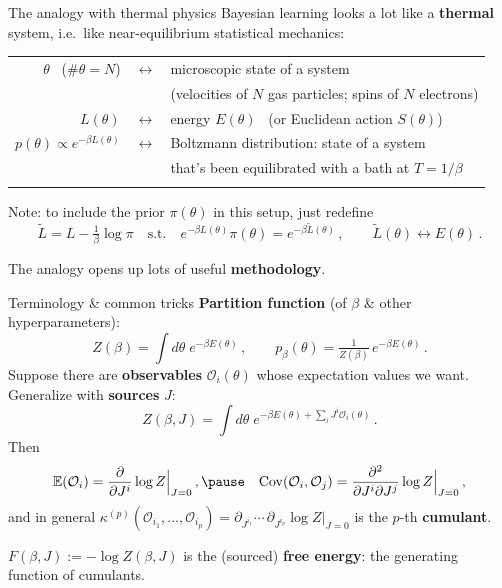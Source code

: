 \documentclass[11pt]{beamer}
\newcommand{\E}{\mathbb{E}}
\newcommand{\pd}{\partial}
\newcommand{\hl}[1]{{\color{blue!60!black}\textbf{#1}}}
\begin{document}
\begin{frame}{The analogy with thermal physics}
  Bayesian learning looks a lot like a \hl{thermal} system,
  i.e.\ like near-equilibrium statistical mechanics: \pause
  \vspace{-.5cm}
  \begin{center}
  \renewcommand{\arraystretch}{1.35}
  \begin{tabular}{r@{\;\;}c@{\;\;}l}
    $\theta$ \ ($\#\theta = N$) &$\leftrightarrow$& microscopic state of a system \\[-2pt]
    && \footnotesize (velocities of $N$ gas particles; spins of $N$ electrons) \\ \pause
    $L(\theta)$ &$\leftrightarrow$& energy $E(\theta)$ \ (or Euclidean action $S(\theta)$) \\ \pause
    $p(\theta) \propto e^{-\beta L(\theta)}$ &$\leftrightarrow$& Boltzmann distribution:
      state of a system \\[-2pt]
    && that's been equilibrated with a bath at
      $T = 1/\beta$ \\ \pause
  \end{tabular}
  \end{center}
  \vspace{2mm}
  Note: to include the prior $\pi(\theta)$ in this setup, just redefine
  \[
    \tilde L = L - \tfrac1\beta \log\pi
    \quad\text{s.t.}\quad
    e^{-\beta L(\theta)}\pi(\theta) = e^{-\beta \tilde L(\theta)}\,,\qquad
    \tilde L(\theta) \leftrightarrow E(\theta)\,.
  \]
  \vspace{-.2cm} \pause

  The analogy opens up lots of useful \hl{methodology}.
\end{frame}

\begin{frame}{Terminology \& common tricks}
  \hl{Partition function} (of $\beta$ \& other hyperparameters):
  \[
    Z(\beta) = \int d\theta\; e^{-\beta E(\theta)}\,,\qquad
    p_\beta(\theta) = \tfrac1{Z(\beta)}\, e^{-\beta E(\theta)}\,.
  \]  \pause
  Suppose there are \hl{observables} $\mathcal O_i(\theta)$ whose expectation values
  we want. \pause Generalize with \hl{sources} $J$:
  \[
    Z(\beta, J) = \int d\theta\; e^{-\beta E(\theta) + \sum_i J^i \mathcal O_i(\theta)}\,.
  \] \pause
  Then
  \[
    \E(\mathcal O_i) = \frac{\pd}{\pd J^i}\log Z\Big|_{J=0}\,, \pause \quad
    \mathrm{Cov}(\mathcal O_i, \mathcal O_j) = \frac{\pd^2}{\pd J^i \pd J^j}\log Z\Big|_{J=0}\,,
  \] \pause
  and in general $\displaystyle \kappa^{(p)}(\mathcal O_{i_1},\dots,\mathcal O_{i_p}) =
  \pd_{J^{i_1}}\!\cdots\,\pd_{J^{i_p}} \log Z\big|_{J=0}$ is the $p$-th
  \hl{cumulant}. \pause
  \vspace{2mm}

  $F(\beta, J) := -\log Z(\beta, J)$ is the (sourced) \hl{free energy}:
  the generating function of cumulants.
\end{frame}
\end{document}
